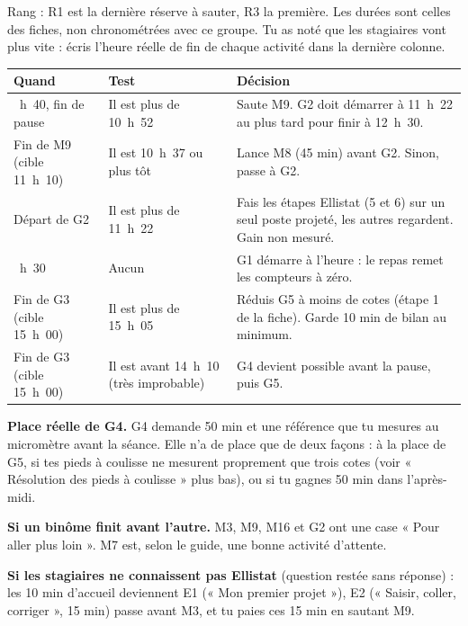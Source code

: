 \documentclass[10pt,a4paper]{article}
\newcommand{\h}[2]{#1~h~#2}
\begin{document}
\par\smallskip
\footnotesize Rang : R1 est la dernière réserve à sauter, R3 la première. Les durées sont celles des fiches, non chronométrées avec ce groupe. Tu as noté que les stagiaires vont plus vite : écris l'heure réelle de fin de chaque activité dans la dernière colonne.

\renewcommand{\arraystretch}{1.1}\small
\begin{tabularx}{\linewidth}{|>{\raggedright\arraybackslash}p{30mm}|>{\raggedright\arraybackslash}p{40mm}|>{\raggedright\arraybackslash}X|}\hline
\rowcolor{uimm}\color{white}\textbf{Quand} & \color{white}\textbf{Test} & \color{white}\textbf{Décision}\\\hline
\h{10}{40}, fin de pause & Il est plus de \h{10}{52} & Saute M9. G2 doit démarrer à \h{11}{22} au plus tard pour finir à \h{12}{30}.\\ \hline
Fin de M9 (cible \h{11}{10}) & Il est \h{10}{37} ou plus tôt & Lance M8 (45 min) avant G2. Sinon, passe à G2.\\ \hline
Départ de G2 & Il est plus de \h{11}{22} & Fais les étapes Ellistat (5 et 6) sur un seul poste projeté, les autres regardent. Gain non mesuré.\\ \hline
\h{13}{30} & Aucun & G1 démarre à l'heure : le repas remet les compteurs à zéro.\\ \hline
Fin de G3 (cible \h{15}{00}) & Il est plus de \h{15}{05} & Réduis G5 à moins de cotes (étape 1 de la fiche). Garde 10 min de bilan au minimum.\\ \hline
Fin de G3 (cible \h{15}{00}) & Il est avant \h{14}{10} (très improbable) & G4 devient possible avant la pause, puis G5.\\ \hline
\end{tabularx}
\par\smallskip
\textbf{Place réelle de G4.} G4 demande 50 min et une référence que tu mesures au micromètre avant la séance. Elle n'a de place que de deux façons : à la place de G5, si tes pieds à coulisse ne mesurent proprement que trois cotes (voir « Résolution des pieds à coulisse » plus bas), ou si tu gagnes 50 min dans l'après-midi.

\textbf{Si un binôme finit avant l'autre.} M3, M9, M16 et G2 ont une case « Pour aller plus loin ». M7 est, selon le guide, une bonne activité d'attente.

\textbf{Si les stagiaires ne connaissent pas Ellistat} (question restée sans réponse) : les 10 min d'accueil deviennent E1 (« Mon premier projet »), E2 (« Saisir, coller, corriger », 15 min) passe avant M3, et tu paies ces 15 min en sautant M9.
\end{document}
